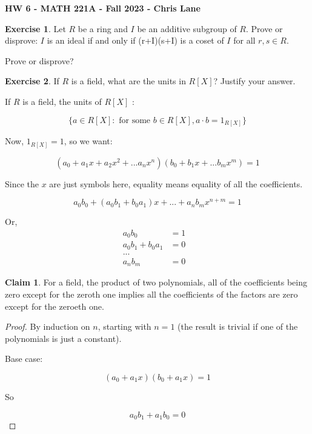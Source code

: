 \documentclass[11pt,oneside]{article}
\numberwithin{equation}{section}
\theoremstyle{definition}
\newtheorem{exercise}{Exercise}
\newtheorem*{claim}{Claim}
\begin{document}
\textbf{HW 6 - MATH 221A - Fall 2023 - Chris Lane}

\begin{exercise}
  Let $R$ be a ring and $I$ be an additive subgroup of $R$.  Prove or
  disprove: $I$ is an ideal if and only if (r+I)(s+I) is a coset of
  $I$ for all $r, s \in R$.
\end{exercise}
\begin{solution}
  Prove or disprove? 
\end{solution}

\begin{exercise}
  If $R$ is a field, what are the units in $R[X]$?  Justify your answer.  
\end{exercise}
\begin{solution}
  If $R$ is a field, the units of $R[X]$ :

  $$
  \{ a \in R[X] : \textrm{ for some } b \in R[X], a \cdot b = 1 _ {R[X]} \}
  $$

  Now, $1_{R[X]} = 1$, so we want:

  $$
  (a_0 + a_1 x + a_2 x^2 + ... a_n x^n) ( b_0 + b_1 x + ... b_m x^m) = 1
  $$

  Since the $x$ are just symbols here, equality means equality of all the coefficients.

  $$
  a_0 b_0 + (a_0 b_1 + b_0 a_1 ) x + ... + a_n b_m x^ {n+m} = 1
  $$
  
  Or,
  \begin{align*}
    a_0 b_0 & = 1 & \\
    a_0 b_1 + b_0 a_1 & =0 \\
    ...& & \\
    a_n b_m & = 0
  \end{align*}

  \begin{claim}
    For a field, the product of two polynomials, all of the
    coefficients being zero except for the zeroth one implies all the
    coefficients of the factors are zero except for the zeroeth one.  
  \end{claim}
  \begin{proof}
    By induction on $n$, starting with $n = 1$ (the result is
    trivial if one of the polynomials is just a constant).

    Base case:

    $$
    (a_0 + a_1x) (b_0 + a_1x) =  1
    $$

    So

    \begin{equation}
      \label{eq1}
      a_0 b_1 + a_1 b_0 = 0
    \end{equation}


\end{proof}
\end{solution}
\end{document}
